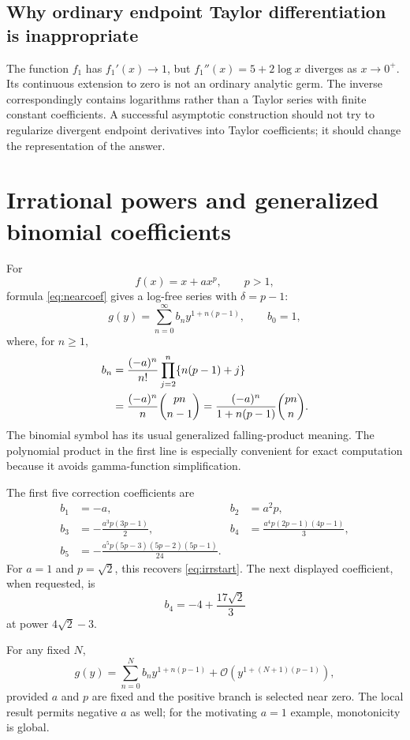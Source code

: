 \documentclass[11pt,a4paper]{article}
\numberwithin{equation}{section}
\theoremstyle{definition}\newtheorem{definition}[theorem]{Definition}
\theoremstyle{remark}\newtheorem{remark}[theorem]{Remark}
\newcommand{\OO}{\mathcal O}\newcommand{\Id}{\mathrm{id}}
\begin{document}
\subsection{Why ordinary endpoint Taylor differentiation is inappropriate}
The function $f_1$ has $f_1'(x)\to1$, but $f_1''(x)=5+2\log x$ diverges as $x\to0^+$. Its continuous extension to zero is not an ordinary analytic germ. The inverse correspondingly contains logarithms rather than a Taylor series with finite constant coefficients. A successful asymptotic construction should not try to regularize divergent endpoint derivatives into Taylor coefficients; it should change the representation of the answer.

\section{Irrational powers and generalized binomial coefficients}
\label{sec:irrational}
For
\[
f(x)=x+a x^p,\qquad p>1,
\]
formula \eqref{eq:nearcoef} gives a log-free series with $\delta=p-1$:
\begin{equation}\label{eq:monomial}
g(y)=\sum_{n=0}^{\infty}b_n y^{1+n(p-1)},\qquad b_0=1,
\end{equation}
where, for $n\ge1$,
\begin{align}\label{eq:binomial}
b_n&=\frac{(-a)^n}{n!}\prod_{j=2}^{n}\{n(p-1)+j\}\\
&=\frac{(-a)^n}{n}\binom{pn}{n-1}
=\frac{(-a)^n}{1+n(p-1)}\binom{pn}{n}.\notag
\end{align}
The binomial symbol has its usual generalized falling-product meaning. The polynomial product in the first line is especially convenient for exact computation because it avoids gamma-function simplification.

The first five correction coefficients are
\begin{align*}
b_1&=-a, & b_2&=a^2p,\\
b_3&=-\frac{a^3p(3p-1)}2,
& b_4&=\frac{a^4p(2p-1)(4p-1)}3,\\
b_5&=-\frac{a^5p(5p-3)(5p-2)(5p-1)}{24}.
\end{align*}
For $a=1$ and $p=\sqrt2$, this recovers \eqref{eq:irrstart}. The next displayed coefficient, when requested, is
\[
b_4=-4+\frac{17\sqrt2}{3}
\]
at power $4\sqrt2-3$.

For any fixed $N$,
\begin{equation}
g(y)=\sum_{n=0}^{N}b_n y^{1+n(p-1)}
+\OO\!\left(y^{1+(N+1)(p-1)}\right),
\end{equation}
provided $a$ and $p$ are fixed and the positive branch is selected near zero. The local result permits negative $a$ as well; for the motivating $a=1$ example, monotonicity is global.
\end{document}
